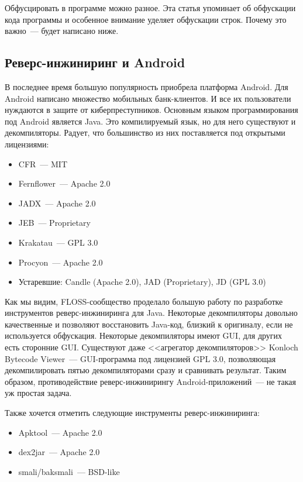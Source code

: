 \documentclass[10pt, a5paper]{article}
\begin{document}
Обфусцировать в программе можно разное. Эта статья упоминает об обфускации кода программы и особенное внимание уделяет обфускации строк. Почему это важно~--- будет написано ниже.

\subsection*{Реверс-инжиниринг и Android}

В последнее время большую популярность приобрела платформа Android. Для Android написано множество мобильных банк-клиентов. И все их пользователи нуждаются в защите от киберпреступников. Основным языком программирования под Android является Java. Это компилируемый язык, но для него существуют и декомпиляторы. Радует, что большинство из них поставляется под открытыми лицензиями:

\begin{itemize}
  \item CFR~--- MIT
  \item Fernflower~--- Apache 2.0
  \item JADX~--- Apache 2.0
  \item JEB~--- Proprietary
  \item Krakatau~--- GPL 3.0
  \item Procyon~--- Apache 2.0
  \item Устаревшие: Candle (Apache 2.0), JAD (Proprietary), JD (GPL 3.0)
\end{itemize}

Как мы видим, FLOSS-сообщество проделало большую работу по разработке инструментов реверс-инжиниринга для Java. Некоторые декомпиляторы довольно качественные и позволяют восстановить Java-код, близкий к оригиналу, если не используется обфускация. Некоторые декомпиляторы имеют GUI, для других есть сторонние GUI. Существуют даже <<агрегатор декомпиляторов>> \linebreak Konloch Bytecode Viewer~--- GUI-программа под лицензией GPL 3.0, позволяющая декомпилировать пятью декомпиляторами сразу и сравнивать результат. Таким образом, противодействие реверс-\linebreak инжинирингу Android-приложений~--- не такая уж простая задача.

Также хочется отметить следующие инструменты реверс-\linebreak инжиниринга:

\begin{itemize}
  \item Apktool~--- Apache 2.0
  \item dex2jar~--- Apache 2.0
  \item smali/baksmali~--- BSD-like
\end{itemize}
\end{document}
